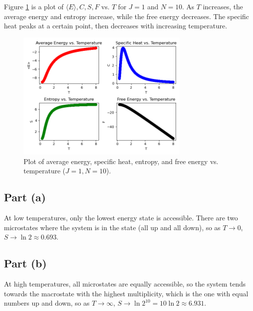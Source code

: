 \documentclass{article}
\begin{document}
\clearpage

\problem
Figure \ref{fig:fig1} is a plot of $\langle E \rangle, C, S, F$ vs. $T$ for $J = 1$ and $N = 10$. As $T$ increases, the average energy and entropy increase, while the free energy decreases. The specific heat peaks at a certain point, then decreases with increasing temperature.
    
\begin{figure}[!htb]
    \centering
    \includegraphics[width=0.75\textwidth]{../code/phy112l_lab3/3-4.png}
    \caption{Plot of average energy, specific heat, entropy, and free energy vs. temperature ($J = 1, N = 10$).}
    \label{fig:fig1}
\end{figure}
\clearpage

\problem
\subsection*{Part (a)}
At low temperatures, only the lowest energy state is accessible. There are two microstates where the system is in the state (all up and all down), so as $T \to 0$, $S \to \ln 2 \approx 0.693$.

\subsection*{Part (b)}
At high temperatures, all microstates are equally accessible, so the system tends towards the macrostate with the highest multiplicity, which is the one with equal numbers up and down, so as $T \to \infty$, $S \to \ln 2^{10} = 10\ln 2 \approx 6.931$. 
\end{document}
